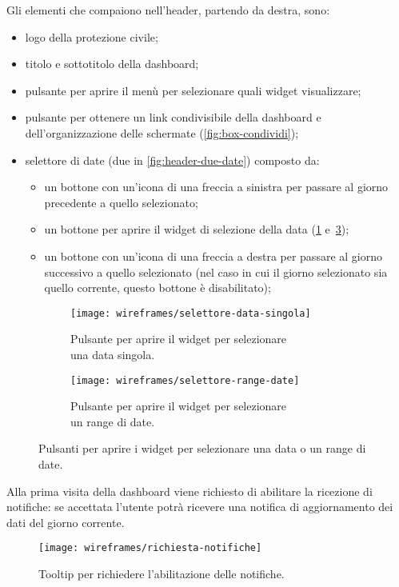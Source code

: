 \documentclass[../../../main.tex]{subfiles}
\begin{document}
Gli elementi che compaiono nell'header, partendo da destra, sono:
\begin{itemize}
    \item logo della protezione civile;
    \item titolo e sottotitolo della dashboard;
    \item pulsante per aprire il menù per selezionare quali widget visualizzare;
    \item pulsante per ottenere un link condivisibile della dashboard e dell'organizzazione delle schermate (\ref{fig:box-condividi});
    \item selettore di date (due in \ref{fig:header-due-date}) composto da:
    \begin{itemize}
        \item un bottone con un'icona di una freccia a sinistra per passare al giorno precedente a quello selezionato;
        \item un bottone per aprire il widget di selezione della data (\ref{fig:selettore-data-singola} e~\ref{fig:selettore-range-date});
        \item un bottone con un'icona di una freccia a destra per passare al giorno successivo a quello selezionato (nel caso in cui il giorno selezionato sia quello corrente, questo bottone è disabilitato);
    \end{itemize}
\end{itemize}

\begin{figure}[H]
    \begin{subfigure}[b]{0.5\textwidth}
        \centering
        \texttt{[image: wireframes/selettore-data-singola]}
        \caption{Pulsante per aprire il widget per selezionare\\ una data singola.}\label{fig:selettore-data-singola}
    \end{subfigure}
\hfill
    \begin{subfigure}[b]{0.5\textwidth}
        \centering
        \texttt{[image: wireframes/selettore-range-date]}
        \caption{Pulsante per aprire il widget per selezionare\\un range di date.}\label{fig:selettore-range-date}
    \end{subfigure}
    \caption{Pulsanti per aprire i widget per selezionare una data o un range di date.}
\end{figure}

Alla prima visita della dashboard viene richiesto di abilitare la ricezione di notifiche: se accettata l'utente potrà ricevere una notifica di aggiornamento dei dati del giorno corrente.
\begin{figure}[H]
    \centering
    \texttt{[image: wireframes/richiesta-notifiche]}
    \caption{Tooltip per richiedere l'abilitazione delle notifiche.}\label{fig:richiesta-notifiche}
\end{figure}
\end{document}
